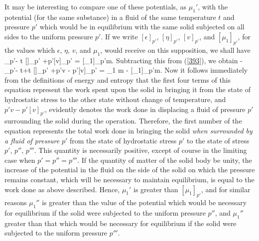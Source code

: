 \documentclass[12pt]{article}
\begin{document}
{It may be interesting to compare one of these potentials, as $\mu_1'$, with the potential (for the same substance) in a fluid of the same temperature $t$ and pressure $p'$ which would be in equilibrium with the same solid subjected on all sides to the uniform pressure $p'$. If we write $[\epsilon]_{p'}$, $[\eta]_{p'}$, $[v]_{p'}$, and $[\mu_1]_{p'}$, for the values which $\epsilon$, $\eta$, $v$, and $\mu_1$, would receive on this supposition, we shall have
\eqs \left[\epsilon\right]_{p'}- t [\eta]_{p'} +p'[v]_{p'} = [\mu_1]_{p'}m.  \label{396}\eqe
Subtracting this from (\ref{393}), we obtain
\eqs \epsilon - \left[\epsilon\right]_{p'}- t\eta+t [\eta]_{p'} +p'v - p'[v]_{p'} = \mu_1 m - [\mu_1]_{p'}m. \label{397}\eqe
Now it follows immediately from the definitions of energy and entropy that the first four terms of this equation represent the work spent upon the solid in bringing it from the state of hydrostatic stress to the other state without change of temperature, and $p'v-p'[v]_{p'}$, evidently denotes the work done in displacing a fluid of pressure $p'$ surrounding the solid during the operation. Therefore, the first number of the equation represents the total work done in bringing the solid \textit{when surrounded by a fluid of pressure} $p'$ from the state of hydrostatic stress $p'$ to the state of stress $p'$, $p''$, $p'''$. This quantity is necessarily positive, except of course in the limiting case when $p'=p''=p'''$. If the quantity of matter of the solid body be unity, the increase of the potential in the fluid on the side of the solid on which the pressure remains constant, which will be necessary to maintain equilibrium, is equal to the work done as above described. Hence, $\mu_1'$ is greater than $[\mu_1]_{p'}$, and for similar reasons $\mu_1''$ is greater than the value of the potential which would be necessary for equilibrium if the solid were subjected to the uniform pressure $p''$, and $\mu_1''$ greater than that which would be necessary for equilibrium if the solid were subjected to the uniform pressure $p'''$. 
}
\end{document}
